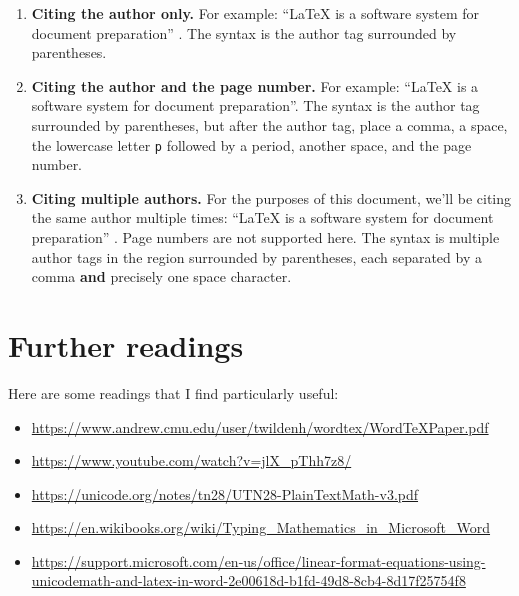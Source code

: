 \documentclass[12pt]{article}
\theoremstyle{plain}
\theoremstyle{remark}
\theoremstyle{definition}
\begin{document}
\begin{enumerate}
\def\labelenumi{\arabic{enumi}.}
\item
  \textbf{Citing the author only.} For example: ``LaTeX is a software
  system for document preparation'' \cite{sampleArticle}. The syntax is the
  author tag surrounded by parentheses.
\item
  \textbf{Citing the author and the page number.} For example: ``LaTeX
  is a software system for document preparation''\cite[1]{sampleArticle}.
  The syntax is the author tag surrounded by parentheses, but after the
  author tag, place a comma, a space, the lowercase letter \texttt{p}
  followed by a period, another space, and the page number.
\item
  \textbf{Citing multiple authors.} For the purposes of this document,
  we'll be citing the same author multiple times: ``LaTeX is a software
  system for document preparation'' \cite{sampleArticle,sampleArticle}. Page numbers are not supported here. The syntax is
  multiple author tags in the region surrounded by parentheses, each
  separated by a comma \textbf{and} precisely one space character.
\end{enumerate}



\medskip
\printbibliography[heading=bibnumbered]

\section{Further readings}

Here are some readings that I find particularly useful:

\begin{itemize}
\item
  \url{https://www.andrew.cmu.edu/user/twildenh/wordtex/WordTeXPaper.pdf}
\item
  \url{https://www.youtube.com/watch?v=jlX_pThh7z8/}
\item
  \url{https://unicode.org/notes/tn28/UTN28-PlainTextMath-v3.pdf}
\item
  \url{https://en.wikibooks.org/wiki/Typing_Mathematics_in_Microsoft_Word}
\item
  \url{https://support.microsoft.com/en-us/office/linear-format-equations-using-unicodemath-and-latex-in-word-2e00618d-b1fd-49d8-8cb4-8d17f25754f8}
\end{itemize}
\end{document}
